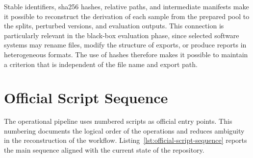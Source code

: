 Stable identifiers, \gls{sha256} hashes, relative paths, and intermediate
manifests make it possible to reconstruct the derivation of each sample from
the prepared pool to the splits, perturbed versions, and evaluation outputs.
This connection is particularly relevant in the black-box evaluation phase,
since selected software systems may rename files, modify the structure of
exports, or produce reports in heterogeneous formats. The use of hashes
therefore makes it possible to maintain a criterion that is independent of the
file name and export path.


\section{Official Script Sequence}
\label{app:official-script-sequence}

The operational pipeline uses numbered scripts as official entry points. This
numbering documents the logical order of the operations and reduces ambiguity in
the reconstruction of the workflow. Listing~\ref{lst:official-script-sequence}
reports the main sequence aligned with the current state of the repository.

